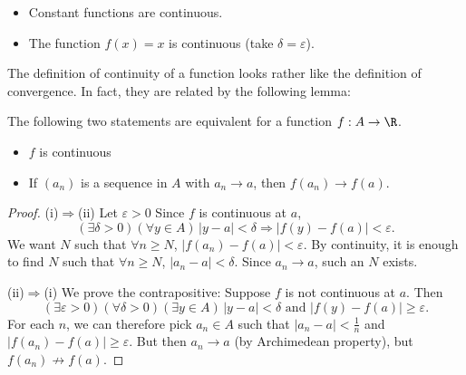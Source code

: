 \documentclass[a4paper]{article}
\begin{document}
\begin{eg}\leavevmode
  \begin{itemize}
    \item Constant functions are continuous.
    \item The function $f(x) = x$ is continuous (take $\delta = \varepsilon$).
  \end{itemize}
\end{eg}

The definition of continuity of a function looks rather like the definition of convergence. In fact, they are related by the following lemma:

\begin{lemma}
  The following two statements are equivalent for a function $f: A\to \R$.
  \begin{itemize}
    \item $f$ is continuous
    \item If $(a_n)$ is a sequence in $A$ with $a_n \to a$, then $f(a_n) \to f(a)$.
  \end{itemize}
\end{lemma}

\begin{proof}
  (i)$\Rightarrow$(ii) Let $\varepsilon > 0$ Since $f$ is continuous at $a$,
  \[
    (\exists \delta > 0)(\forall y\in A)\, |y-a|< \delta \Rightarrow |f(y) - f(a)| < \varepsilon.
  \]
  We want $N$ such that $\forall n \geq N$, $|f(a_n) - f(a)| < \varepsilon$. By continuity, it is enough to find $N$ such that $\forall n\geq N$, $|a_n - a| < \delta$. Since $a_n \to a$, such an $N$ exists.

  (ii)$\Rightarrow$(i) We prove the contrapositive: Suppose $f$ is not continuous at $a$. Then
  \[
    (\exists \varepsilon > 0)(\forall \delta > 0)(\exists y\in A)\, |y - a| < \delta \text{ and }|f(y) - f(a)| \geq \varepsilon.
  \]
  For each $n$, we can therefore pick $a_n \in A$ such that $|a_n - a| < \frac{1}{n}$ and $|f(a_n) - f(a)| \geq \varepsilon$. But then $a_n \to a$ (by Archimedean property), but $f(a_n) \not\to f(a)$.
\end{proof}
\end{document}
